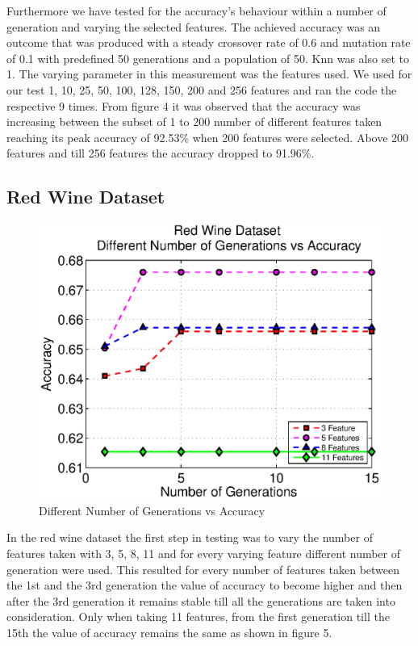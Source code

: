 \documentclass[11pt,onecolumn,a4paper]{article}
\begin{document}
    
    
    
    Furthermore we have tested for the accuracy's behaviour within a number of generation and varying the selected features. The achieved accuracy was an outcome that was produced with a steady crossover rate of 0.6 and mutation rate of 0.1 with predefined 50 generations and a population of 50. Knn was also set to 1. The varying parameter in this measurement was the features used. We used for our test 1, 10, 25, 50, 100, 128, 150, 200 and 256 features and ran the code the respective 9 times. From figure 4 it was observed that the accuracy was increasing between the subset of 1 to 200 number of different features taken reaching its peak accuracy of 92.53\% when 200 features were selected. Above 200 features and till 256 features the accuracy dropped to 91.96\%.    

\subsection{Red Wine Dataset }

  \begin{figure}[h!]
      \centering
      \includegraphics[width=0.6\linewidth]{img/winefeat.eps}
      \caption{Different Number of Generations vs Accuracy}
   \end{figure}
 In the red wine dataset the first step in testing was to vary the number of features taken with 3, 5, 8, 11 and for every varying  feature different number of generation were used. This resulted for every number of features taken between the 1st and the 3rd generation the value of accuracy to become higher and then after the 3rd generation it remains stable till all the generations are taken into consideration. Only when taking 11 features, from the first generation till the 15th the value of accuracy remains the same as shown in figure 5.    
   
\end{document}
